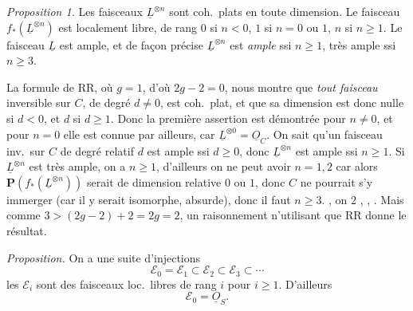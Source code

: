 \documentclass[11pt,a4paper]{article}
\begin{document}
\emph{Proposition 1.} Les faisceaux $\underline{L}^{\otimes n}$ sont coh.\ plats en
toute dimension. Le faisceau $f_*(\underline{L}^{\otimes n})$ est localement libre,
de rang $0$ si $n<0$, $1$ si $n=0$ ou $1$, $n$ si $n\geqslant 1$. \struck{\ill{}} Le
faisceau $\underline{L}$ est ample, et de façon précise $\underline{L}^{\otimes n}$
est  \emph{ample}  ssi $n\geqslant 1$, très ample ssi
$n\geqslant 3$.

La formule de RR, où $g=1$, d'où $2g-2=0$, nous montre que \emph{tout faisceau}
 inversible sur $C$, de degré  $d\neq 0$, est coh.\ plat, et que sa dimension est donc nulle si
$d<0$, et $d$ \struck{\ill{}} si $d\geqslant 1$. Donc la première assertion est
démontrée pour $n\neq 0$, et pour $n=0$ elle est connue par ailleurs, car
$\underline{L}^{\otimes 0}=\underline{O}_C$. On sait  qu'un faisceau
inv.\ sur $C$ de degré relatif $d$ est ample ssi $d\geqslant 0$, donc
$\underline{L}^{\otimes n}$ est ample ssi $n\geqslant 1$. %
Si $\underline{L}^{\otimes n}$ est très ample, on a $n\geqslant 1$, d'ailleurs on
ne peut avoir $n=1,2$ car alors $\mathbf{P}(f_*(\underline{L}^{\otimes n}))$ serait
de dimension relative $0$ ou $1$, donc $C$ ne pourrait s'y immerger
(car il y serait isomorphe, absurde), donc il faut $n\geqslant 3$. \ill{} ,
on \ill{} \ill{} \ill{} \ill{} $2$ , \ill{} \ill{} \ill{} \ill{} \ill{}
, \ill{} \ill{}  .
 
Mais  comme $3 > (2g-2)+2 = 2g = 2$, un raisonnement  n'utilisant
que RR donne le résultat.

\emph{Proposition.} On a une suite \ill{} \struck{\ill{}} d'injections
\[
\mathcal{E}_0 = \mathcal{E}_1 \subset \mathcal{E}_2 \subset \mathcal{E}_3 \subset \cdots
\]
les $\mathcal{E}_i$ sont des faisceaux loc.\ libres de rang $i$
pour $i\geqslant 1$. D'ailleurs
\[
\mathcal{E}_0 = \underline{O}_S .
\]
\end{document}
